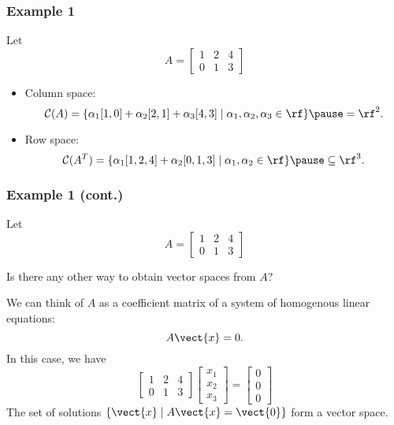 \begin{frame}
  \frametitle{Example 1}

  Let
  \[
  A =
  \begin{bmatrix}
    1 & 2 & 4 \\
    0 & 1 & 3
  \end{bmatrix}
  \]

  \vspace{0.2in}
  
  \pause
  \begin{itemize}
  \item Column space:
    \[
      {\mathcal C}(A) =
      \{
      \alpha_1[1,0] + \alpha_2[2,1] +\alpha_3[4,3] \;|\; \alpha_1,\alpha_2,\alpha_3\in\rf
      \}
      \pause
      = \rf^2.
      \]
    \item Row space:
    \[
      {\mathcal C}(A^T) =
      \{
      \alpha_1[1,2,4] + \alpha_2[0,1,3] \;|\; \alpha_1,\alpha_2\in\rf
      \}
      \pause
      \subseteq \rf^3.
      \]
  \end{itemize}
\end{frame}

\begin{frame}
  \frametitle{Example 1 (cont.)}

  Let
  \[
  A =
  \begin{bmatrix}
    1 & 2 & 4 \\
    0 & 1 & 3
  \end{bmatrix}
  \]

  Is there any other way to obtain vector spaces from $A$?  \pause

  \vspace{0.2in}

  We can think of $A$ as a coefficient matrix of a system of
  homogenous linear equations:
  \[
  A\vect{x} = 0.
  \]
  In this case, we have
  \[
  \begin{bmatrix}
    1 & 2 & 4 \\
    0 & 1 & 3
  \end{bmatrix}
  \begin{bmatrix}
    x_1\\ x_2 \\ x_3
  \end{bmatrix}
  =
  \begin{bmatrix}
    0\\ 0\\ 0
  \end{bmatrix}
  \]
  \pause
  The set of solutions $\{\vect{x} \;|\; A\vect{x}=\vect{0} \}$ form a vector space.
\end{frame}

